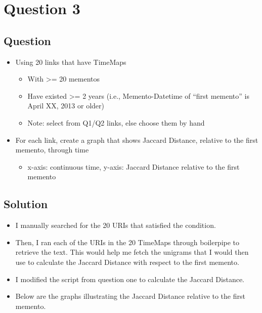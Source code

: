 \chapter{Question 3}
\label{question-3}
\section{Question}

\begin{itemize}
\item Using 20 links that have TimeMaps
\begin{itemize}
\item With >= 20 mementos
\item Have existed \textgreater = 2 years (i.e., Memento-Datetime of “first memento” is April XX, 2013 or older)
\item Note: select from Q1/Q2 links, else choose them by hand
\end{itemize}
\item For each link, create a graph that shows Jaccard Distance, relative to the first memento, through time
	\begin{itemize}
		\item x-axis: continuous time, y-axis: Jaccard Distance relative to the first memento
	\end{itemize}
\end{itemize}


\section{Solution}
\begin{itemize}
\item I manually searched for the 20 URIs that satisfied the condition.
\item Then, I ran each of the URIs in the 20 TimeMaps through boilerpipe to retrieve the text. This would help me fetch the unigrams that I would then use to calculate the Jaccard Distance with respect to the first memento.
\item I modified the script from question one to calculate the Jaccard Distance.
\item Below are the graphs illustrating the Jaccard Distance relative to the first memento.
\end{itemize}

